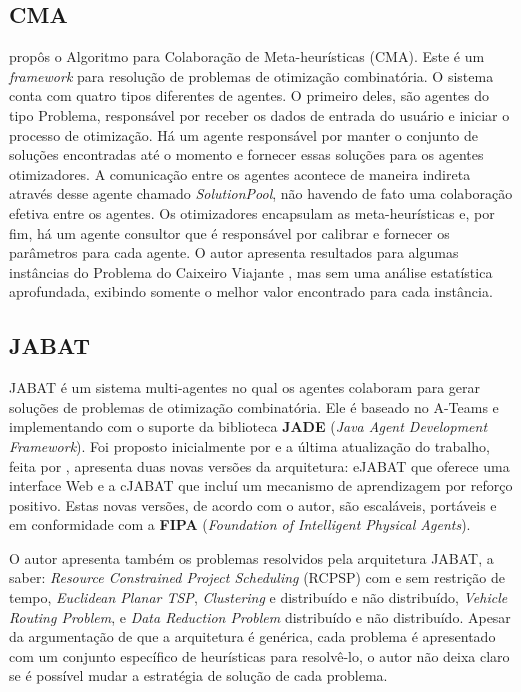 \subsection{CMA}
 propôs o Algoritmo para Colaboração de Meta-heurísticas (CMA). Este é um \textit{framework} para resolução de problemas de otimização combinatória. O sistema conta com quatro tipos diferentes de agentes. O primeiro deles, são agentes do tipo Problema, responsável por receber os dados de entrada do usuário e iniciar o processo de otimização. Há um agente responsável por manter o conjunto de soluções encontradas até o momento e fornecer essas soluções para os agentes otimizadores. A comunicação entre os agentes acontece de maneira indireta através desse agente chamado \textit{SolutionPool}, não havendo de fato uma colaboração efetiva entre os agentes. Os otimizadores encapsulam as meta-heurísticas e, por fim, há um agente consultor que é responsável por calibrar e fornecer os parâmetros para cada agente. O autor apresenta resultados para algumas instâncias do Problema do Caixeiro Viajante \cite{malek2010}, mas sem uma análise estatística aprofundada, exibindo somente o melhor valor encontrado para cada instância. 

\subsection{JABAT}
JABAT é um sistema multi-agentes no qual os agentes colaboram para gerar soluções de problemas de otimização combinatória. Ele é baseado no A-Teams e implementando com o suporte da biblioteca \textbf{JADE} (\textit{Java Agent Development Framework}). Foi proposto inicialmente por  e a última atualização do trabalho, feita por , apresenta duas novas versões da arquitetura: eJABAT que oferece uma interface Web e a cJABAT que incluí um mecanismo de aprendizagem por reforço positivo. Estas novas versões, de acordo com o autor, são escaláveis, portáveis e em conformidade com a \textbf{FIPA} (\textit{Foundation of Intelligent Physical Agents}). 

O autor apresenta também os problemas resolvidos pela arquitetura JABAT, a saber: \textit{Resource Constrained Project Scheduling} (RCPSP) com e sem restrição de tempo, \textit{Euclidean Planar TSP}, \textit{Clustering} e distribuído e não distribuído, \textit{Vehicle Routing Problem}, e \textit{Data Reduction Problem} distribuído e não distribuído. Apesar da argumentação de que a arquitetura é genérica, cada problema é apresentado com um conjunto específico de heurísticas para resolvê-lo, o autor não deixa claro se é possível mudar a estratégia de solução de cada problema. 

